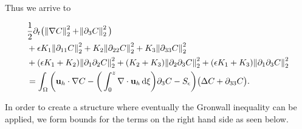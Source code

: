 \documentclass[11pt]{article}
\newcommand*\diff{\mathop{}\!\mathrm{d}}
\begin{document}
Thus we arrive to

\begin{equation}
  \begin{split}
    &\frac{1}{2} \partial_t \big( \norm{\nabla C}_2^2 + \norm{\partial_3 C}^2_2 \big) \\
    & + \epsilon K_1 \norm{\partial_{11} C}^2_2 + K_2 \norm{\partial_{22} C}^2_2 + K_3 \norm{\partial_{33} C}^2_2 \\
    & + (\epsilon K_1 + K_2) \norm{\partial_1 \partial_2 C}_2^2 + (K_2 + K_3) \norm{\partial_2 \partial_3 C}_2^2 + (\epsilon K_1 + K_3) \norm{\partial_1 \partial_3 C}_2^2 \\
    & = \int_\Omega \bigg ( \mathbf{u}_h \cdot \nabla C - \bigg( \int_0^z \nabla \cdot \mathbf{u}_h \diff \xi \bigg) \partial_3 C - S_\epsilon \bigg ) \big( \Delta C + \partial_{33} C \big).
  \end{split}
\end{equation}

In order to create a structure where eventually the Gronwall inequality can be applied, we form bounds for the terms on the right hand side as seen below.
\end{document}
